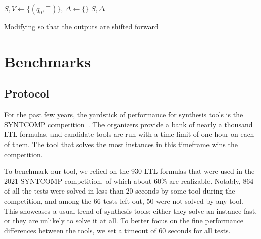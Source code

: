 \documentclass[runningheads,a4paper]{llncs}
\begin{document}
\begin{algorithm}[H]

\BlankLine
\(S,V \leftarrow \{(q_0,\top)\}\), \(\Delta \leftarrow \{\}\)\;
\Return \(S,\Delta\)
\caption{Modifying \cA so that the outputs are shifted forward}
\label{alg:caddys-madness}
\end{algorithm}

\section{Benchmarks}\label{sec:benchmarks}

\subsection{Protocol}

For the past few years, the yardstick of performance for synthesis tools is the
SYNTCOMP competition~\cite{syntcomp17}.  The organizers provide a bank of nearly a
thousand LTL formulas, and candidate tools are run with a time limit of one hour
on each of them.  The tool that solves the most instances in this timeframe wins
the competition.

To benchmark our tool, we relied on the 930 LTL formulas that were used in the
2021 SYNTCOMP competition, of which about 60\% are realizable.  Notably, 864 of
all the tests were solved in less than 20 seconds by some tool during the
competition, and among the 66 tests left out, 50 were not solved by any tool.
This showcases a usual trend of synthesis tools: either they solve an instance
fast, or they are unlikely to solve it at all.  To better focus on the fine
performance differences between the tools, we set a timeout of 60 seconds for
all tests.
\end{document}
